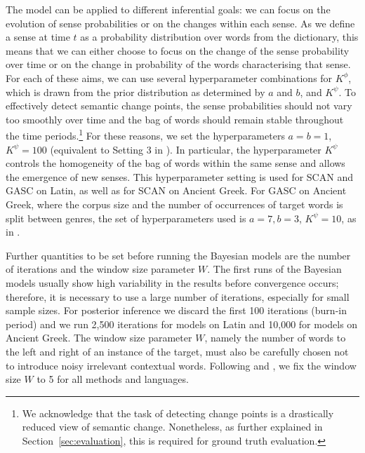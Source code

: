 \documentclass[output=paper%
]{langscibook}
\begin{document}
The model can be applied to different inferential goals: we can focus on the evolution of sense probabilities or on the changes within each sense. As we define a sense at time $t$ as a probability distribution over words from the dictionary, this means that we can either choose to focus on the change of the sense probability over time or on the change in probability of the words characterising that sense. For each of these aims, we can use several hyperparameter combinations for $K^\phi$, which is drawn from the prior distribution as determined by $a$ and $b$, and $K^\psi$.
To effectively detect semantic change points, the sense probabilities should not vary too smoothly over time and the bag of words should remain stable throughout the time periods.\footnote{We acknowledge that the task of detecting change points is a drastically reduced view of semantic change. Nonetheless, as further explained in Section~\ref{sec:evaluation}, this is required for ground truth evaluation.} For these reasons, we set the hyperparameters $a = b = 1$, $K^\psi = 100$ (equivalent to Setting 3 in \citealt{perrone-etal-2019-gasc}). In particular, the hyperparameter $K^\psi$ controls the homogeneity of the bag of words within the same sense and allows the emergence of new senses. This hyperparameter setting is used for SCAN and GASC on Latin, as well as for SCAN on Ancient Greek. For GASC on Ancient Greek, where the corpus size and the number of occurrences of target words is split between genres, the set of hyperparameters used is $a = 7, b = 3$, $K^\psi = 10$, as in \citet{frermann-lapata-2016-bayesian}.

Further quantities to be set before running the Bayesian models are the number of iterations and the window size parameter $W$. The first runs of the Bayesian models usually show high variability in the results before convergence occurs; therefore, it is necessary to use a large number of iterations, especially for small sample sizes. For posterior inference we discard the first 100 iterations (burn-in period) and we run 2,500 iterations for models on Latin and 10,000 for models on Ancient Greek. The window size parameter $W$, namely the number of words to the left and right of an instance of the target, must also be carefully chosen not to introduce noisy irrelevant contextual words. Following \citet{frermann-lapata-2016-bayesian} and \citet{perrone-etal-2019-gasc}, we fix the window size $W$ to 5 for all methods and languages.
\end{document}
